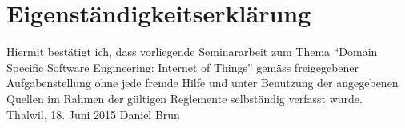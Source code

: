 
\chapter*{Eigenständigkeitserklärung}
\thispagestyle{empty}
%
Hiermit bestätigt ich, dass vorliegende Seminararbeit zum Thema "`Domain Specific Software Engineering: Internet of Things"'
gemäss freigegebener Aufgabenstellung ohne jede fremde Hilfe und unter Benutzung der angegebenen Quellen im Rahmen der gültigen Reglemente selbständig verfasst wurde. 
%
\mbox{}\vspace{4\baselineskip}\\
%
Thalwil, 18. Juni 2015 \hfill Daniel Brun
\clearpage\mbox{}\thispagestyle{empty}


%

